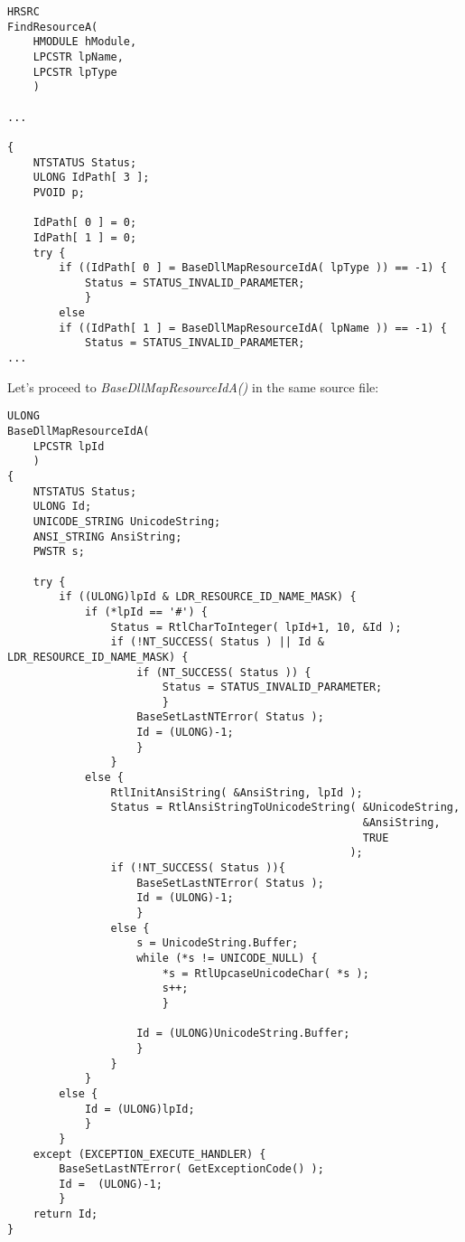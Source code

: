 \begin{lstlisting}[style=customc]
HRSRC
FindResourceA(
    HMODULE hModule,
    LPCSTR lpName,
    LPCSTR lpType
    )

...

{
    NTSTATUS Status;
    ULONG IdPath[ 3 ];
    PVOID p;

    IdPath[ 0 ] = 0;
    IdPath[ 1 ] = 0;
    try {
        if ((IdPath[ 0 ] = BaseDllMapResourceIdA( lpType )) == -1) {
            Status = STATUS_INVALID_PARAMETER;
            }
        else
        if ((IdPath[ 1 ] = BaseDllMapResourceIdA( lpName )) == -1) {
            Status = STATUS_INVALID_PARAMETER;
...
\end{lstlisting}

Let's proceed to \emph{BaseDllMapResourceIdA()} in the same source file:

\begin{lstlisting}[style=customc]
ULONG
BaseDllMapResourceIdA(
    LPCSTR lpId
    )
{
    NTSTATUS Status;
    ULONG Id;
    UNICODE_STRING UnicodeString;
    ANSI_STRING AnsiString;
    PWSTR s;

    try {
        if ((ULONG)lpId & LDR_RESOURCE_ID_NAME_MASK) {
            if (*lpId == '#') {
                Status = RtlCharToInteger( lpId+1, 10, &Id );
                if (!NT_SUCCESS( Status ) || Id & LDR_RESOURCE_ID_NAME_MASK) {
                    if (NT_SUCCESS( Status )) {
                        Status = STATUS_INVALID_PARAMETER;
                        }
                    BaseSetLastNTError( Status );
                    Id = (ULONG)-1;
                    }
                }
            else {
                RtlInitAnsiString( &AnsiString, lpId );
                Status = RtlAnsiStringToUnicodeString( &UnicodeString,
                                                       &AnsiString,
                                                       TRUE
                                                     );
                if (!NT_SUCCESS( Status )){
                    BaseSetLastNTError( Status );
                    Id = (ULONG)-1;
                    }
                else {
                    s = UnicodeString.Buffer;
                    while (*s != UNICODE_NULL) {
                        *s = RtlUpcaseUnicodeChar( *s );
                        s++;
                        }

                    Id = (ULONG)UnicodeString.Buffer;
                    }
                }
            }
        else {
            Id = (ULONG)lpId;
            }
        }
    except (EXCEPTION_EXECUTE_HANDLER) {
        BaseSetLastNTError( GetExceptionCode() );
        Id =  (ULONG)-1;
        }
    return Id;
}
\end{lstlisting}

